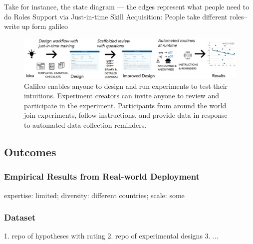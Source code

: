 Take for instance, the state diagram — the edges represent what people need to do 
Roles Support via Just-in-time Skill Acquisition:  People take different roles--write up form galileo


\begin{figure}[h] 
  \centering
  \includegraphics[width=1.0\textwidth]{figures/galileo/galileo-1}
  \caption[]
{Galileo enables anyone to design and run experiments to test their intuitions. Experiment creators can invite anyone to review and participate in the experiment. Participants from around the world join experiments, follow instructions, and provide data in response to automated data collection reminders.}
  \label{fig:galileo-1}
\end{figure}


\subsection{Outcomes}
\subsubsection{Empirical Results from Real-world Deployment}
expertise: limited; diversity: different countries; scale: some

\subsubsection{Dataset}
1. repo of hypotheses with rating
2. repo of experimental designs
3. ...

